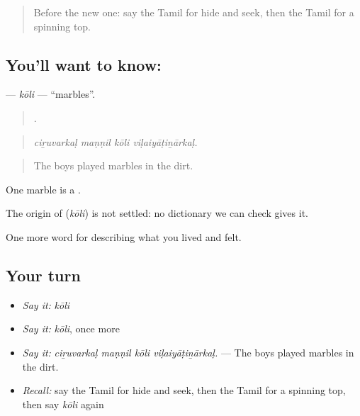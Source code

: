 \label{lesson:TA-C530-koli}



\begin{quote}
Before the new one: say the Tamil for hide and seek, then the Tamil for a spinning top.
\end{quote}

\subsection*{You'll want to know: }
\textbf{} — \emph{kōli} — \textquotedblleft{}marbles\textquotedblright{}.

\begin{quote}
   .
\end{quote}

\begin{quote}
\emph{ciṟuvarkaḷ maṇṇil kōli viḷaiyāṭiṉārkaḷ.}
\end{quote}

\begin{quote}
The boys played marbles in the dirt.
\end{quote}

One marble is a .

\begin{cousinweb}
The origin of \textbf{} (\emph{kōli}) is not settled: no dictionary we can check gives it.
\end{cousinweb}

\begin{grammarlens}[title={What you've built}]
One more word for describing what you lived and felt.
\end{grammarlens}

\subsection*{Your turn}
\begin{itemize}
\raggedright
  \item \emph{Say it:} \emph{kōli}
  \item \emph{Say it:} \emph{kōli}, once more
  \item \emph{Say it:} \emph{ciṟuvarkaḷ maṇṇil kōli viḷaiyāṭiṉārkaḷ.} — The boys played marbles in the dirt.
  \item \emph{Recall:} say the Tamil for hide and seek, then the Tamil for a spinning top, then say \emph{kōli} again
\end{itemize}

